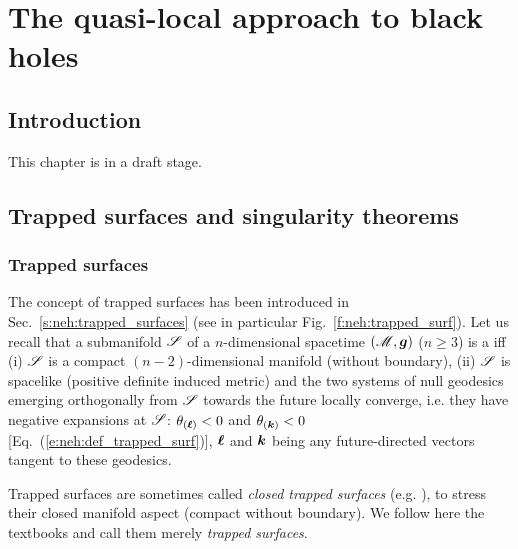 \chapter{The quasi-local approach to black holes}
\label{s:loc}

\minitoc

\section{Introduction}

This chapter is in a draft stage.

\section{Trapped surfaces and singularity theorems}

\subsection{Trapped surfaces} \label{s:loc:trapped_surf}

The concept of trapped surfaces has been introduced in Sec.~\ref{s:neh:trapped_surfaces}
(see in particular Fig.~\ref{f:neh:trapped_surf}). Let us recall that
a submanifold $\mathscr{S}$ of a $n$-dimensional spacetime $(\mathscr{M}, \bm{g})$ ($n\ge 3$) is
a  iff (i) $\mathscr{S}$ is a compact $(n-2)$-dimensional manifold
(without boundary), (ii) $\mathscr{S}$ is spacelike (positive definite induced metric)
and the two systems of null geodesics emerging orthogonally from $\mathscr{S}$ towards the future
locally converge, i.e. they have negative expansions at $\mathscr{S}$:
$\theta_{(\bm{\ell})} < 0$ and $\theta_{(\bm{k})} < 0$ [Eq.~(\ref{e:neh:def_trapped_surf})],
$\bm{\ell}$ and $\bm{k}$ being
any future-directed vectors tangent to these geodesics.

\begin{remark}
Trapped surfaces are sometimes called
\emph{closed trapped surfaces} (e.g. \cite{Penro65,HawkiE73}),
to stress their closed manifold aspect (compact without boundary).
We follow here the textbooks \cite{MisneTW73,Wald84} and call them merely
\emph{trapped surfaces}.
\end{remark}

